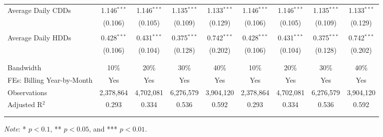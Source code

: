 {\begin{table}[t!]
\begin{adjustbox}{scale = 0.9}
\begin{threeparttable}
\begin{tabular}{@{\extracolsep{3pt}}lcccccccc}
                    Average Daily CDDs & 1.146$^{***}$ & 1.146$^{***}$ & 1.135$^{***}$ & 1.133$^{***}$ & 1.146$^{***}$ & 1.146$^{***}$ & 1.135$^{***}$ & 1.133$^{***}$ \\ 
                    & (0.106) & (0.105) & (0.109) & (0.129) & (0.106) & (0.105) & (0.109) & (0.129) \\ 
                    & & & & & & & & \\ 
                    Average Daily HDDs & 0.428$^{***}$ & 0.431$^{***}$ & 0.375$^{***}$ & 0.742$^{***}$ & 0.428$^{***}$ & 0.431$^{***}$ & 0.375$^{***}$ & 0.742$^{***}$ \\ 
                    & (0.106) & (0.104) & (0.128) & (0.202) & (0.106) & (0.104) & (0.128) & (0.202) \\ 
                    & & & & & & & & \\
                    \hline
                    \\[-2.0ex]
                    Bandwidth & 10\% & 20\% & 30\% & 40\% & 10\% & 20\% & 30\% & 40\% \\ 
                    FEs: Billing Year-by-Month & Yes & Yes & Yes & Yes & Yes & Yes & Yes & Yes \\ 
                    Observations & 2,378,864 & 4,702,081 & 6,276,579 & 3,904,120 & 2,378,864 & 4,702,081 & 6,276,579 & 3,904,120 \\ 
                    Adjusted R$^{2}$ & 0.293 & 0.334 & 0.536 & 0.592 & 0.293 & 0.334 & 0.536 & 0.592 \\
                    \\[-2.0ex]
                    \hline \hline
                    \\[-4.5ex]
                \end{tabular}
                \begin{tablenotes}[flushleft]
                    \footnotesize
                    \item \textit{Note}: * $p < 0.1$, ** $p < 0.05$, and *** $p < 0.01$.
                \end{tablenotes}
            \end{threeparttable}
        \end{adjustbox}
        
    \end{table}
}
